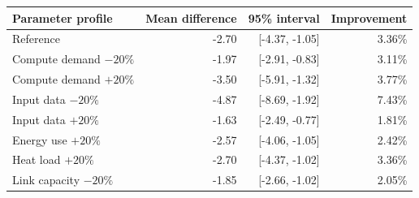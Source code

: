 \begin{tabular}{lrrr}
\toprule
Parameter profile & Mean difference & 95\% interval & Improvement \\
\midrule
Reference & -2.70 & [-4.37, -1.05] & 3.36\% \\
Compute demand $-20\%$ & -1.97 & [-2.91, -0.83] & 3.11\% \\
Compute demand $+20\%$ & -3.50 & [-5.91, -1.32] & 3.77\% \\
Input data $-20\%$ & -4.87 & [-8.69, -1.92] & 7.43\% \\
Input data $+20\%$ & -1.63 & [-2.49, -0.77] & 1.81\% \\
Energy use $+20\%$ & -2.57 & [-4.06, -1.05] & 2.42\% \\
Heat load $+20\%$ & -2.70 & [-4.37, -1.02] & 3.36\% \\
Link capacity $-20\%$ & -1.85 & [-2.66, -1.02] & 2.05\% \\
\bottomrule
\end{tabular}